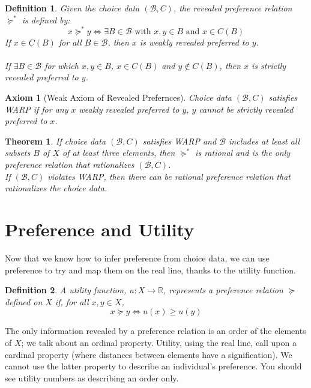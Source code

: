 \documentclass[12pt]{report}
\newtheorem{theorem}{Theorem}[chapter]
\newtheorem{definition}{Definition}[chapter]
\newtheorem{axiom}{Axiom}[chapter]
\begin{document}
\begin{definition}
Given the choice data $(\mathcal{B}, C)$, the revealed preference relation $\succeq^*$ is defined by: $$ x\succeq^*y \Leftrightarrow \exists B\in\mathcal{B}\text{ with } x,y\in B\text{ and } x\in C(B) $$ If $x\in C(B)$ for all $B\in\mathcal{B}$, then $x$ is weakly revealed preferred to $y$.\\ \\
If $\exists B\in\mathcal{B}$ for which $x,y\in B$, $x\in C(B)$ and $y\not\in C(B)$, then $x$ is strictly revealed preferred to $y$.
\end{definition}

\begin{axiom}[Weak Axiom of Revealed Prefernces]
Choice data $(\mathcal{B}, C)$ satisfies WARP if for any $x$ weakly revealed preferred to $y$, $y$ cannot be strictly revealed preferred to $x$.
\end{axiom}

\begin{theorem}
If choice data $(\mathcal{B}, C)$ satisfies WARP and $\mathcal{B}$ includes at least all subsets $B$ of $X$ of at least three elements, then $\succeq^*$ is rational and is the only preference relation that rationalizes $(\mathcal{B}, C)$.\\If  $(\mathcal{B}, C)$ violates WARP, then there can be rational preference relation that rationalizes the choice data.
\end{theorem}

\section{Preference and Utility}

Now that we know how to infer preference from choice data, we can use preference to try and map them on the real line, thanks to the utility function.

\begin{definition}
A utility function, $u:X\to\mathbb{R}$, represents a preference relation $\succeq$ defined on $X$ if, for all $x,y\in X$,$$x\succeq y \Leftrightarrow u(x)\geq u(y)$$
\end{definition}

The only information revealed by a preference relation is an order of the elements of $X$; we talk about an ordinal property. Utility, using the real line, call upon a cardinal property (where distances between elements have a signification). We cannot use the latter property to describe an individual's preference. You should see utility numbers as describing an order only.
\end{document}

